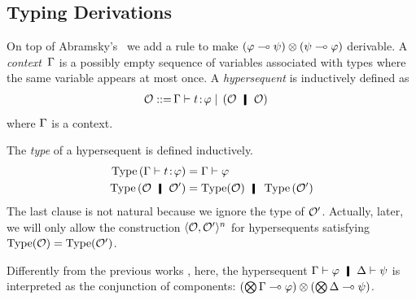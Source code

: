 \subsection{Typing Derivations}

On top of Abramsky's~\citep{abramsky1993computational} we add a rule to
make $(\varphi\multimap\psi)\otimes(\psi\multimap\varphi)$ derivable.
A \textit{context}~$\Gamma$ is a possibly empty sequence of
variables associated with
types where the same variable appears at most once.
A \textit{hypersequent} is inductively defined as
\begin{align*}
 \hypert ::=\, &\G\tr\tj{t}{\phi}
 \mid\, (\hypert\hmid \hypert)
\end{align*}
where $\Gamma$ is a context.

The \textit{type} of a hypersequent is
defined inductively.
\begin{align*}
 \type{(\G\tr\tj{t}\phi)}&= \G\tr\phi \\
 \type{(\hypert \hmid \hypert')}&= \type(\hypert)\hmid\type{(\hypert')}
\end{align*}
The last clause is not natural because we ignore the type of $\mathcal{O}'$.
Actually, later, we will only allow the construction
$\langle{\mathcal{O},\mathcal{O}'}\rangle^n$ for hypersequents satisfying
$\operatorname{Type}(\mathcal{O}) = \operatorname{Type}(\mathcal{O}')$.

Differently from the previous works ,
here, the hypersequent $\G\tr\phi\hmid \D\tr\psi$ is interpreted as the
conjunction of components:
$(\bigotimes\Gamma\multimap\varphi)\otimes (\bigotimes\Delta\multimap\psi)$.


